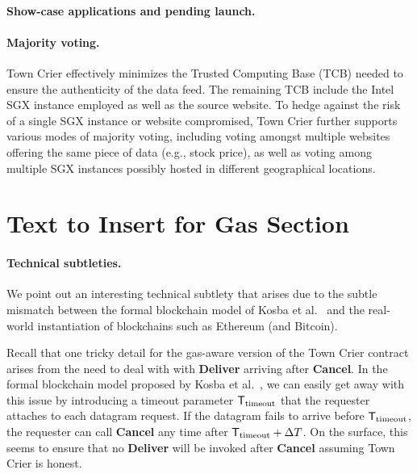 \paragraph{Show-case applications and pending launch.}



\paragraph{Majority voting.}
Town Crier effectively minimizes the 
Trusted Computing Base (TCB) needed to ensure
the authenticity of the data feed.
The remaining TCB include the Intel SGX 
instance employed as well as the source website. 
To hedge against the risk of a single SGX instance
or website compromised, Town Crier further supports 
various modes of majority voting,  
including voting amongst multiple 
websites offering the same piece of data (e.g., stock price),  
as well as voting among multiple SGX instances possibly
hosted in different geographical locations.



\section{Text to Insert for Gas Section} 



\newcommand{\Ttimeout}{\ensuremath{{\sf T}_{\text{timeout}}}\xspace}

\paragraph{Technical subtleties.}
We point out an interesting technical subtlety
that arises due to the subtle mismatch
between the formal blockchain model of 
Kosba et al.~\cite{hawk}
and 
the real-world instantiation of blockchains such as Ethereum (and Bitcoin). 

Recall that one tricky detail for the gas-aware version of the Town Crier 
contract arises from the need to deal with  
with {\bf Deliver}
arriving after {\bf Cancel}.
In the formal blockchain model
proposed by Kosba et al.~\cite{hawk}, we can easily get away with this issue 
by introducing 
a timeout parameter
$\Ttimeout$ that the requester attaches to each datagram request. 
If the datagram fails to arrive before $\Ttimeout$, 
the requester can call {\bf Cancel}
any time after 
$\Ttimeout + \Delta T$.  
On the surface, this 
seems to ensure that no {\bf Deliver} will be invoked
after {\bf Cancel} assuming Town Crier is honest. 

